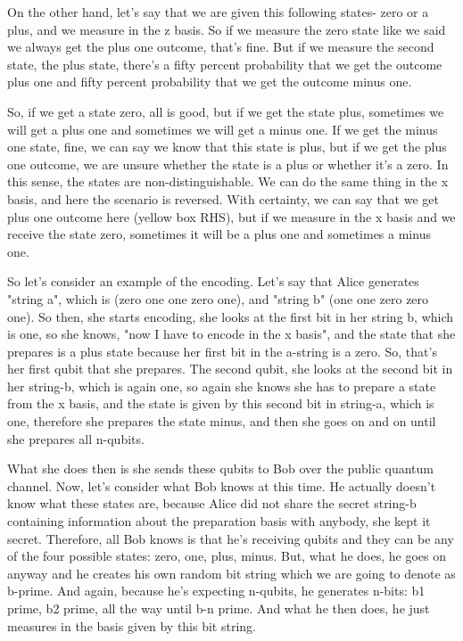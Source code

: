 On the other hand, let's say that we are given this following states- zero or a plus, and we measure in the z basis. So if we measure the zero state like we said we always get the plus one outcome, that's fine. But if we measure the second state, the plus state, there's a fifty percent probability that we get the outcome plus one and fifty percent probability that we get the outcome minus one.

So, if we get a state zero, all is good, but if we get the state plus, sometimes we will get a plus one and sometimes we will get a minus one. If we get the minus one state, fine, we can say we know that this state is plus, but if we get the plus one outcome, we are unsure whether the state is a plus or whether it's a zero. In this sense, the states are non-distinguishable. We can do the same thing in the x basis, and here the scenario is reversed. With certainty, we can say that we get plus one outcome here (yellow box RHS), but if we measure in the x basis and we receive the state zero, sometimes it will be a plus one and sometimes a minus one.

So let's consider an example of the encoding. Let's say that Alice generates "string a", which is (zero one one zero one), and "string b" (one one zero zero one). So then, she starts encoding, she looks at the first bit in her string b, which is one, so she knows, "now I have to encode in the x basis", and the state that she prepares is a plus state because her first bit in the a-string is a zero. So, that's her first qubit that she prepares. The second qubit, she looks at the second bit in her string-b, which is again one, so again she knows she has to prepare a state from the x basis, and the state is given by this second bit in string-a, which is one, therefore she prepares the state minus, and then she goes on and on until she prepares all n-qubits.

What she does then is she sends these qubits to Bob over the public quantum channel. Now, let's consider what Bob knows at this time. He actually doesn't know what these states are, because Alice did not share the secret string-b containing information about the preparation basis with anybody, she kept it secret. Therefore, all Bob knows is that he's receiving qubits and they can be any of the four possible states: zero, one, plus, minus. But, what he does, he goes on anyway and he creates his own random bit string which we are going to denote as b-prime. And again, because he's expecting n-qubits, he generates n-bits: b1 prime, b2 prime, all the way until b-n prime. And what he then does, he just measures in the basis given by this bit string.

